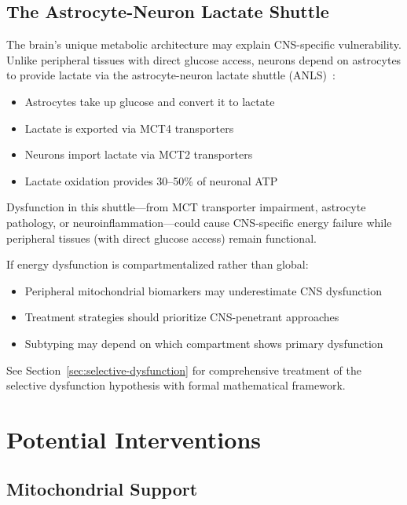 \subsection{The Astrocyte-Neuron Lactate Shuttle}

The brain's unique metabolic architecture may explain CNS-specific vulnerability. Unlike peripheral tissues with direct glucose access, neurons depend on astrocytes to provide lactate via the astrocyte-neuron lactate shuttle (ANLS)~\cite{Pellerin1994,Magistretti2018}:

\begin{itemize}
    \item Astrocytes take up glucose and convert it to lactate
    \item Lactate is exported via MCT4 transporters
    \item Neurons import lactate via MCT2 transporters
    \item Lactate oxidation provides 30--50\% of neuronal ATP~\cite{Belanger2011}
\end{itemize}

Dysfunction in this shuttle---from MCT transporter impairment, astrocyte pathology, or neuroinflammation---could cause CNS-specific energy failure while peripheral tissues (with direct glucose access) remain functional.

\begin{keypoint}
If energy dysfunction is compartmentalized rather than global:
\begin{itemize}
    \item Peripheral mitochondrial biomarkers may underestimate CNS dysfunction
    \item Treatment strategies should prioritize CNS-penetrant approaches
    \item Subtyping may depend on which compartment shows primary dysfunction
\end{itemize}
See Section~\ref{sec:selective-dysfunction} for comprehensive treatment of the selective dysfunction hypothesis with formal mathematical framework.
\end{keypoint}


\section{Potential Interventions}
\label{sec:energy-interventions}

\subsection{Mitochondrial Support}

